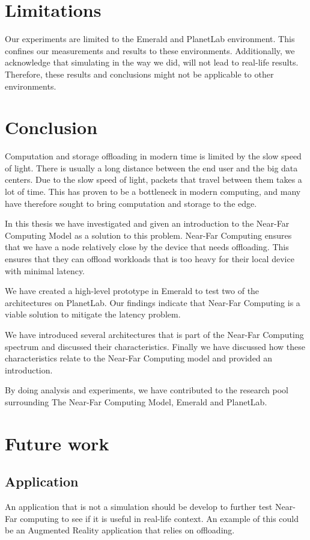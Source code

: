 \section{Limitations}
Our experiments are limited to the Emerald and PlanetLab environment. This confines our measurements and results to these environments. Additionally, we acknowledge that simulating in the way we did, will not lead to real-life results. Therefore, these results and conclusions might not be applicable to other environments.


\section{Conclusion}
Computation and storage offloading in modern time is limited by the slow speed of light. There is usually a long distance between the end user and the big data centers. Due to the slow speed of light, packets that travel between them takes a lot of time. This has proven to be a bottleneck in modern computing, and many have therefore sought to bring computation and storage to the edge. 

In this thesis we have investigated and given an introduction to the Near-Far Computing Model as a solution to this problem. Near-Far Computing ensures that we have a node relatively close by the device that needs offloading. This ensures that they can offload workloads that is too heavy for their local device with minimal latency. 

We have created a high-level prototype in Emerald to test two of the architectures on PlanetLab. Our findings indicate that Near-Far Computing is a viable solution to mitigate the latency problem. 

We have introduced several architectures that is part of the Near-Far Computing spectrum and discussed their characteristics. Finally we have discussed how these characteristics relate to the Near-Far Computing model and provided an introduction.

By doing analysis and experiments, we have contributed to the research pool surrounding The Near-Far Computing Model, Emerald and PlanetLab.



\section{Future work}
\subsection{Application}
An application that is not a simulation should be develop to further test Near-Far computing to see if it is useful in real-life context. An example of this could be an Augmented Reality application that relies on offloading. 

